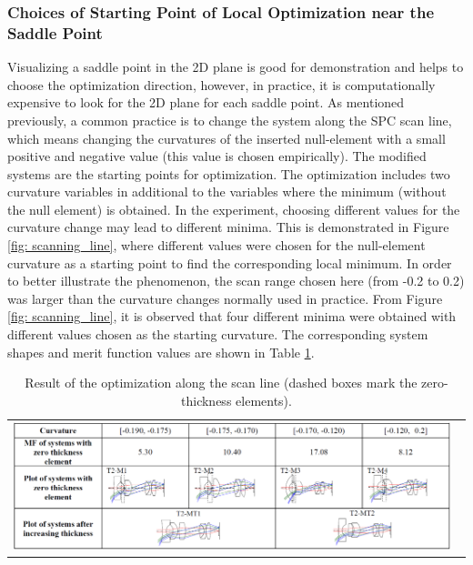 \subsubsection{Choices of Starting Point of Local Optimization near the Saddle Point}
Visualizing a saddle point in the 2D plane is good for demonstration and helps to choose the optimization direction, however, in practice, it is computationally expensive to look for the 2D plane for each saddle point. As mentioned previously, a common practice is to change the system along the SPC scan line, which means changing the curvatures of the inserted null-element with a small positive and negative value (this value is chosen empirically). The modified systems are the starting points for optimization. The optimization includes two curvature variables in additional to the variables where the minimum (without the null element) is obtained. In the experiment, choosing different values for the curvature change may lead to different minima. This is demonstrated in Figure \ref{fig: scanning_line}, where different values were chosen for the null-element curvature as a starting point to find  the corresponding local minimum. In order to better illustrate the phenomenon, the scan range chosen here (from -0.2 to 0.2) was larger than the curvature changes normally used in practice. From Figure \ref{fig: scanning_line}, it is observed that four different minima were obtained with different values chosen as the starting curvature. The corresponding system shapes and merit function values are shown in Table \ref{table: scanline}. 
\begin{table}[h!]
    \centering
    \captionsetup{justification=centering}
    \caption{Result of the optimization along the scan line (dashed boxes mark the zero-thickness elements).}
    \label{table: scanline}
    \vspace{-1em}
    \hspace*{-16.5pt} %
    \begin{tabular}{l}
    \includegraphics[width=0.98\textwidth]{chapter-4/figures/Line_Opt_table.png}
    \end{tabular}
\end{table}
